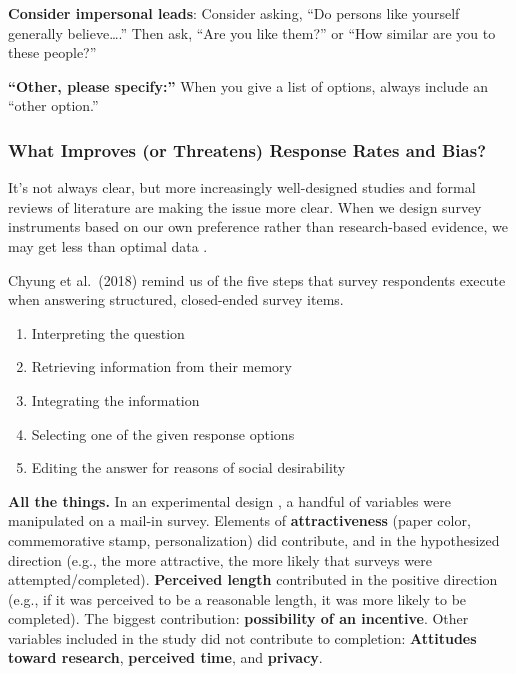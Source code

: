 \documentclass[
  english,
]{book}
\providecommand{\tightlist}{%
  \setlength{\itemsep}{0pt}\setlength{\parskip}{0pt}}
\begin{document}
\textbf{Consider impersonal leads}: Consider asking, ``Do persons like yourself generally believe\ldots.'' Then ask, ``Are you like them?'' or ``How similar are you to these people?''

\textbf{``Other, please specify:''} When you give a list of options, always include an ``other option.''

\hypertarget{what-improves-or-threatens-response-rates-and-bias}{%
\subsubsection{What Improves (or Threatens) Response Rates and Bias?}\label{what-improves-or-threatens-response-rates-and-bias}}

It's not always clear, but more increasingly well-designed studies and formal reviews of literature are making the issue more clear. When we design survey instruments based on our own preference rather than research-based evidence, we
may get less than optimal data \citep{chyung_evidence-based_2018}.

Chyung et al.~(2018) remind us of the five steps \citep{schwarz_asking_2001} that survey respondents execute when answering structured, closed-ended survey items.

\begin{enumerate}
\def\labelenumi{\arabic{enumi}.}
\tightlist
\item
  Interpreting the question
\item
  Retrieving information from their memory
\item
  Integrating the information
\item
  Selecting one of the given response options
\item
  Editing the answer for reasons of social desirability
\end{enumerate}

\textbf{All the things.} In an experimental design \citep{helgeson_determinants_2002}, a handful of variables were manipulated on a mail-in survey. Elements of \textbf{attractiveness} (paper color, commemorative stamp, personalization) did contribute, and in the hypothesized direction (e.g., the more attractive, the more likely that surveys were attempted/completed). \textbf{Perceived length} contributed in the positive direction (e.g., if it was perceived to be a reasonable length, it was more likely to be completed). The biggest contribution: \textbf{possibility of an incentive}. Other variables included in the study did not contribute to completion: \textbf{Attitudes toward research}, \textbf{perceived time}, and \textbf{privacy}.
\end{document}
